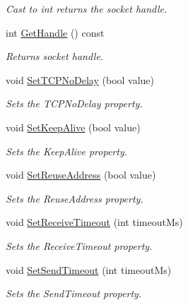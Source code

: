 \begin{DoxyCompactItemize}
\begin{DoxyCompactList}\small\item\em Cast to int returns the socket handle. \end{DoxyCompactList}\item 
\hypertarget{class_common_1_1_socket_base_af24b8fc3cae37f4c9b237b6470f61140}{int \hyperlink{class_common_1_1_socket_base_af24b8fc3cae37f4c9b237b6470f61140}{Get\-Handle} () const }\label{class_common_1_1_socket_base_af24b8fc3cae37f4c9b237b6470f61140}

\begin{DoxyCompactList}\small\item\em Returns socket handle. \end{DoxyCompactList}\item 
void \hyperlink{class_common_1_1_socket_base_ad3cf7e66213c658fa8555477f0ad3410}{Set\-T\-C\-P\-No\-Delay} (bool value)
\begin{DoxyCompactList}\small\item\em Sets the T\-C\-P\-No\-Delay property. \end{DoxyCompactList}\item 
void \hyperlink{class_common_1_1_socket_base_acd5f86f8c326c5acd74da14a4fe8aa32}{Set\-Keep\-Alive} (bool value)
\begin{DoxyCompactList}\small\item\em Sets the Keep\-Alive property. \end{DoxyCompactList}\item 
void \hyperlink{class_common_1_1_socket_base_a1dd5cf7c38c563ffd31831288d055580}{Set\-Reuse\-Address} (bool value)
\begin{DoxyCompactList}\small\item\em Sets the Reuse\-Address property. \end{DoxyCompactList}\item 
void \hyperlink{class_common_1_1_socket_base_a02c77942c75996fe2f83abb3d27affba}{Set\-Receive\-Timeout} (int timeout\-Ms)
\begin{DoxyCompactList}\small\item\em Sets the Receive\-Timeout property. \end{DoxyCompactList}\item 
void \hyperlink{class_common_1_1_socket_base_af5951b6fb2de4e252acbbd6911edcf87}{Set\-Send\-Timeout} (int timeout\-Ms)
\begin{DoxyCompactList}\small\item\em Sets the Send\-Timeout property. \end{DoxyCompactList}\item 

\end{DoxyCompactItemize}
